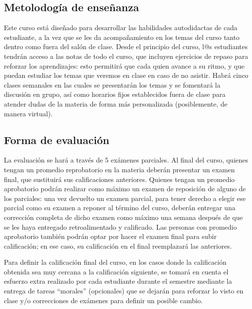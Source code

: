 \documentclass[12pt]{article}
\begin{document}
\subsection{Metolodogía de enseñanza}

Este curso está diseñado para desarrollar las habilidades autodidactas de cada estudiante, a la vez que se les da acompañamiento en los temas del curso tanto dentro como fuera del salón de clase. Desde el principio del curso, l@s estudiantes tendrán acceso a las notas de todo el curso, que incluyen ejercicios de repaso para reforzar los aprendizajes: esto permitirá que cada quien avance a su ritmo, y que puedan estudiar los temas que veremos en clase en caso de no asistir. Habrá cinco clases semanales en las cuales se presentarán los temas y se fomentará la discusión en grupo, así como horarios fijos establecidos fuera de clase para atender dudas de la materia de forma más personalizada (posiblemente, de manera virtual).

\subsection{Forma de evaluación}

La evaluación se hará a través de 5 exámenes parciales. Al final del curso, quienes tengan un promedio reprobatorio en la materia deberán presentar un examen final, que sustituirá sus calificaciones anteriores. Quienes tengan un promedio aprobatorio podrán realizar como máximo un examen de reposición de alguno de los parciales: una vez devuelto un examen parcial, para tener derecho a elegir ese parcial como su examen a reponer al término del curso, deberán entregar una corrección completa de dicho examen como máximo una semana después de que se les haya entregado retroalimentado y calificado. Las personas con promedio aprobatorio también podrán optar por hacer el examen final para subir calificación; en ese caso, su calificación en el final reemplazará las anteriores.

Para definir la calificación final del curso, en los casos donde la calificación obtenida sea muy cercana a la calificación siguiente, se tomará en cuenta el esfuerzo extra realizado por cada estudiante durante el semestre mediante la entrega de tareas ``morales'' (opcionales) \textemdash que se dejarán para reforzar lo visto en clase\textemdash\hspace{1mm} y/o correcciones de exámenes para definir un posible cambio.

\newpage
\end{document}
